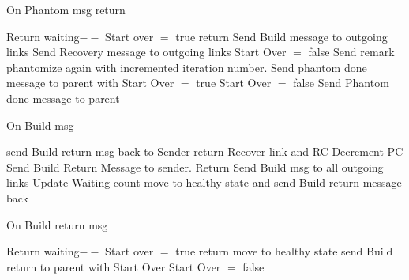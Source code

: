 \documentclass{article}
\begin{document}
	
\begin{algorithm}
\caption{On Phantom msg return}
\label{Phantom Done message received}
\begin{algorithmic}[1]
\State Return
\EndIf
\State waiting$--$
\State Start over $=$ true
\EndIf
{}
\State return
\EndIf
{}
\State Send Build message to outgoing links
\State Send Recovery message to outgoing links
\State Start Over $=$ false
\State Send remark phantomize again with incremented iteration number.
\State Send phantom done message to parent with Start Over $=$ true
\State Start Over $=$ false
\Else
\State Send Phantom done message to parent
\EndIf
\EndProcedure
\end{algorithmic}
\end{algorithm}	


	
\begin{algorithm}
\caption{On Build msg}
\label{Build message received}
\begin{algorithmic}[1]
\State send Build return msg back to Sender
\State return
\EndIf
\State Recover link and RC
\State Decrement PC
\State Send Build Return Message to sender.
\State Return
\EndIf
\State Send Build msg to all outgoing links
\State Update Waiting count
\State move to healthy state and send Build return message back
\EndIf
\EndProcedure
\end{algorithmic}
\end{algorithm}	



\begin{algorithm}
\caption{On Build return msg}
\label{Build return message received}
\begin{algorithmic}[1]
\State Return
\EndIf
\State waiting$--$
\State Start over $=$ true
\EndIf
{}
\State return
\EndIf
\State move to healthy state
\State send Build return to parent with Start Over
\State Start Over $=$ false
\EndIf
\EndProcedure
\end{algorithmic}
\end{algorithm}	
\end{document}
